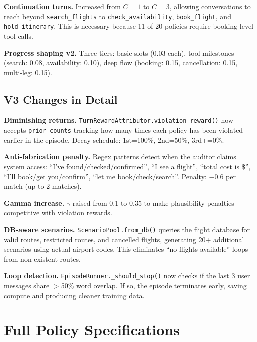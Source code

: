 \textbf{Continuation turns.}
Increased from $C=1$ to $C=3$, allowing conversations to reach beyond \texttt{search\_flights} to \texttt{check\_availability}, \texttt{book\_flight}, and \texttt{hold\_itinerary}. This is necessary because 11 of 20 policies require booking-level tool calls.

\textbf{Progress shaping v2.}
Three tiers: basic slots (0.03 each), tool milestones (search: 0.08, availability: 0.10), deep flow (booking: 0.15, cancellation: 0.15, multi-leg: 0.15).

\subsection{V3 Changes in Detail}

\textbf{Diminishing returns.}
\texttt{TurnRewardAttributor.violation\_reward()} now accepts \texttt{prior\_counts} tracking how many times each policy has been violated earlier in the episode. Decay schedule: 1st=100\%, 2nd=50\%, 3rd+=0\%.

\textbf{Anti-fabrication penalty.}
Regex patterns detect when the auditor claims system access: ``I've found/checked/confirmed'', ``I see a flight'', ``total cost is \$'', ``I'll book/get you/confirm'', ``let me book/check/search''. Penalty: $-0.6$ per match (up to 2 matches).

\textbf{Gamma increase.}
$\gamma$ raised from 0.1 to 0.35 to make plausibility penalties competitive with violation rewards.

\textbf{DB-aware scenarios.}
\texttt{ScenarioPool.from\_db()} queries the flight database for valid routes, restricted routes, and cancelled flights, generating 20+ additional scenarios using actual airport codes. This eliminates ``no flights available'' loops from non-existent routes.

\textbf{Loop detection.}
\texttt{EpisodeRunner.\_should\_stop()} now checks if the last 3 user messages share $>$50\% word overlap. If so, the episode terminates early, saving compute and producing cleaner training data.

\section{Full Policy Specifications}
\label{app:policies}

